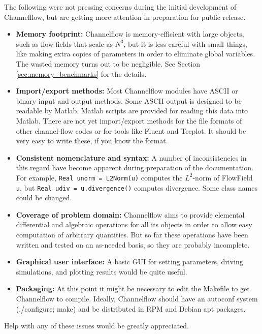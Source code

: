 \documentclass{article}[12pt]
\begin{document}

The following were not pressing concerns during the initial
development of Channelflow, but are getting more attention in
preparation for public release.
\begin{itemize}
\item {\bf Memory footprint:} Channelflow is memory-efficient with
large objects, such as flow fields that scale as $N^3$, but it is less
careful with small things, like making extra copies of parameters in
order to eliminate global variables. The wasted memory turns out to be
negligible. See Section \ref{sec:memory_benchmarks} for the details.
\item {\bf Import/export methods:} Most Channelflow modules have ASCII
or binary input and output methods. Some ASCII output is designed to
be readable by Matlab. Matlab scripts are provided for reading this
data into Matlab. There are not yet import/export methods for the
file formats of other channel-flow codes or for tools like Fluent and
Tecplot. It should be very easy to write these, if you know the format.
\item {\bf Consistent nomenclature and syntax:} A number of inconsistencies
in this regard have become apparent during preparation of the documentation.
For example, {\tt Real unorm = L2Norm(u)} computes the $L^2$-norm of FlowField
{\tt u}, but {\tt Real udiv = u.divergence()} computes divergence. Some class
names could be changed.
\item {\bf Coverage of problem domain:} Channelflow aims to provide
elemental differential and algebraic operations for all its objects in
order to allow easy computation of arbitrary quantities. But so far
these operations have been written and tested on an as-needed basis,
so they are probably incomplete.
\item {\bf Graphical user interface:}  A basic GUI for setting parameters,
driving simulations, and plotting results would be quite useful.
\item {\bf Packaging:} At this point it might be necessary to edit the
Makefile to get Channelflow to compile. Ideally, Channelflow should
have an autoconf system (./configure; make) and be distributed in
RPM and Debian apt packages.
\end{itemize}
Help with any of these issues would be greatly appreciated.
\end{document}
